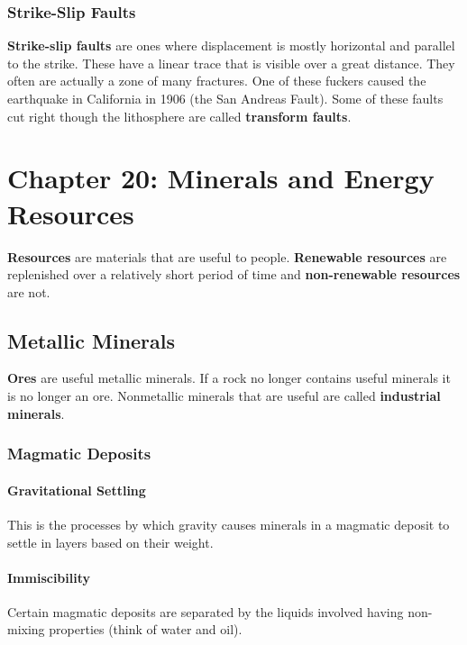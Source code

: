 \documentclass{article}
\begin{document}
\subsubsection{Strike-Slip Faults} %
\label{sub:strike_slip_faults}
\textbf{Strike-slip faults} are ones where displacement is mostly horizontal and parallel to the strike. These have a linear trace that is visible over a great distance. They often are actually a zone of many fractures. One of these fuckers caused the earthquake in California in 1906 (the San Andreas Fault). Some of these faults cut right though the lithosphere are called \textbf{transform faults}.

\section{Chapter 20: Minerals and Energy Resources} %
\label{sec:chapter_20_minerals_and_energy_resources}
\textbf{Resources} are materials that are useful to people. \textbf{Renewable resources} are replenished over a relatively short period of time and \textbf{non-renewable resources} are not.

\subsection{Metallic Minerals} %
\label{sub:metallic_minerals}
\textbf{Ores} are useful metallic minerals. If a rock no longer contains useful minerals it is no longer an ore. Nonmetallic minerals that are useful are called \textbf{industrial minerals}.

\subsubsection{Magmatic Deposits} %
\label{sub:magmatic_deposits}
\paragraph{Gravitational Settling} %
\label{par:gravitational_settling}
This is the processes by which gravity causes minerals in a magmatic deposit to settle in layers based on their weight.

\paragraph{Immiscibility} %
\label{par:immiscibility}
Certain magmatic deposits are separated by the liquids involved having non-mixing properties (think of water and oil).
\end{document}
